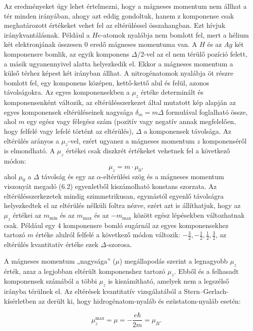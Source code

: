 \documentclass[a4paper,12pt]{article}
\begin{document}
Az eredményeket úgy lehet értelmezni, hogy a mágneses momentum
nem állhat a tér minden irányában, ahogy azt eddig gondoltuk, hanem
z komponense csak meghatározott értékeket vehet fel az eltérüléssel összahangban.
Ezt hívjuk iránykvantálásnak.
Például a $He$-atomok nyalábja nem bomlott fel, mert a hélium két
elektronjának összesen $0$ eredő mágneses momentuma van.
A $H$ és az $Ag$ két komponensre bomlik, az egyik komponens $\Delta/2$-vel
az el nem térülő pozíció felett, a másik ugyanennyivel alatta helyezkedik el.
Ekkor a mágneses momentum a külső térhez képest két irányban állhat.
A nitrogénatomok nyalábja öt részre bomlott fel, egy komponens középen,
kettő-kettő alul és felül, azonos távolságokra.
Az egyes komponensekben a $\mu_z$ értéke determinált és komponensenként
változik, az eltérülésszerkezet által mutatott kép alapján az egyes
komponensek eltérüléseinek nagysága $\delta_m=m\Delta$ formulával
foglalható össze, ahol $m$ egy egész vagy félegész szám (pozitív vagy
negatív annak megfelelően, hogy felfelé vagy lefelé történt az eltérülés),
$\Delta$ a komponensek távolsága.
Az eltérülés arányos a $\mu_z$-vel, ezért ugyanez a mágneses
momentum $z$ komponenséről is elmondható.
A $\mu_z$ értékei csak diszkrét értékeket vehetnek fel a következő módon:
\[
\mu_z = m\cdot\mu_0,
\]
ahol $\mu_0$ a $\Delta$ távolság és egy az $\alpha$-eltérülési szög és a
mágneses momentum viszonyát megadó (6.2) egyenletből kiszámolható
konstans szorzata.
Az eltérülésszerkezetek mindig szimmetrikusan, egymástól egyenlő
távolságra helyezkedtek el az eltérülés nélküli foltra nézve, ezért azt is
állíthatjuk, hogy az $\mu_z$ értékei az $m_{\min}$ és az $m_{\max}$
és az $-m_{\max}$ között egész lépésekben változhatnak csak.
Például egy 4 komponensre bomló sugárnál az egyes komponensekhez tartozó $m$ értéke alulról felfelé a következő
módon változik: $-\tfrac{3}{2}, -\tfrac{1}{2}, \tfrac{1}{2}, \tfrac{3}{2}$,
az eltérülés kvantitatív értéke ezek $\Delta$-szorosa.

A mágneses momentum „nagysága” ($\mu$) megállapodás szerint a legnagyobb
$\mu_z$ érték, azaz a legjobban eltérült komponenshez tartozó $\mu_z$.
Ebből és a felhasadt komponensek számából a többi $\mu_z$ is kiszámítható,
amelyek nem a legszélső irányba térülnek el.
Az eltérések kvantitatív vizsgálatából a Stern–Gerlach-kísérletben az
derült ki, hogy hidrogénatom-nyaláb és ezüstatom-nyaláb esetén:

\begin{equation}
\mu_z^{\max} = \mu = -\frac{e\hbar}{2m} = \mu_B.
\end{equation}
\end{document}
